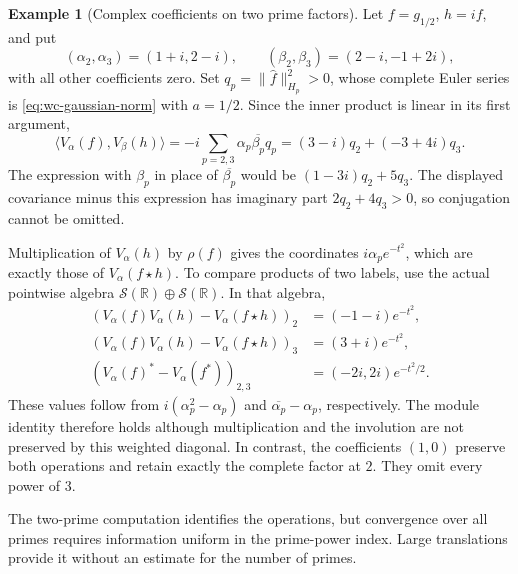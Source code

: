 \documentclass[11pt]{article}
\theoremstyle{definition}
\newtheorem{example}[theorem]{Example}
\theoremstyle{remark}
\numberwithin{equation}{section}
\newcommand{\R}{\mathbb R}
\begin{document}
\begin{example}[Complex coefficients on two prime factors]
\label{ex:wc-complex-diagonal}
Let $f=g_{1/2}$, $h=if$, and put
\[
 (\alpha_2,\alpha_3)=(1+i,2-i),\qquad
 (\beta_2,\beta_3)=(2-i,-1+2i),
\]
with all other coefficients zero.  Set
$q_p=\|\widehat f\|_{H_p}^2>0$, whose complete Euler series is
\eqref{eq:wc-gaussian-norm} with $a=1/2$.
Since the inner product is linear in its first argument,
\begin{equation}
 \langle V_\alpha(f),V_\beta(h)\rangle
 =-i\sum_{p=2,3}\alpha_p\overline{\beta_p}q_p
 =(3-i)q_2+(-3+4i)q_3.
 \label{eq:wc-complex-covariance}
\end{equation}
The expression with $\beta_p$ in place of $\overline{\beta_p}$ would be
$(1-3i)q_2+5q_3$.  The displayed covariance minus this expression has
imaginary part $2q_2+4q_3>0$, so conjugation cannot be omitted.

Multiplication of $V_\alpha(h)$ by $\rho(f)$ gives the coordinates
$i\alpha_p e^{-t^2}$, which are exactly those of
$V_\alpha(f\star h)$.
To compare products of two labels, use the actual pointwise algebra
$\mathscr S(\R)\oplus\mathscr S(\R)$.
In that algebra,
\begin{equation}
 \begin{aligned}
 (V_\alpha(f)V_\alpha(h)-V_\alpha(f\star h))_2
   &=(-1-i)e^{-t^2},\\
 (V_\alpha(f)V_\alpha(h)-V_\alpha(f\star h))_3
   &=(3+i)e^{-t^2},\\
 (V_\alpha(f)^*-V_\alpha(f^*))_{2,3}
   &=(-2i,2i)e^{-t^2/2}.
 \end{aligned}
 \label{eq:wc-complex-defects}
\end{equation}
These values follow from
$i(\alpha_p^2-\alpha_p)$ and
$\overline{\alpha_p}-\alpha_p$, respectively.
The module identity therefore holds although multiplication and the
involution are not preserved by this weighted diagonal.
In contrast, the coefficients $(1,0)$ preserve both operations and retain
exactly the complete factor at $2$.  They omit every power of $3$.
\end{example}

The two-prime computation identifies the operations, but convergence over
all primes requires information uniform in the prime-power index.
Large translations provide it without an estimate for the number of primes.
\end{document}

